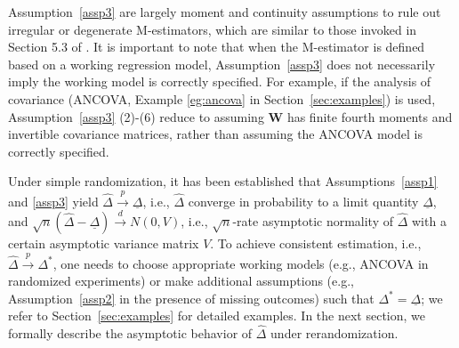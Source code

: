 \documentclass[12pt]{article}
\newcommand{\bW}{\boldsymbol{W}}
\begin{document}
Assumption~\ref{assp3} are largely moment and continuity assumptions to rule out irregular or degenerate M-estimators, which are similar to those invoked in Section 5.3 of \cite{vaart_1998}. It is important to note that when the M-estimator is defined based on a working regression model, Assumption~\ref{assp3} does not necessarily imply the working model is correctly specified. For example, if the analysis of covariance (ANCOVA, Example \ref{eg:ancova} in Section~\ref{sec:examples}) is used, Assumption~\ref{assp3} (2)-(6) reduce to assuming $\bW$ has finite fourth moments and invertible covariance matrices, rather than assuming the ANCOVA model is correctly specified.%

Under simple randomization, it has been established that Assumptions~\ref{assp1} and \ref{assp3} yield $\widehat{\Delta} \xrightarrow{p} \underline{\Delta}$, i.e., $\widehat{\Delta}$ converge  in probability to a limit quantity $\underline{\Delta}$, and $\sqrt{n}(\widehat{\Delta} - \underline{\Delta}) \xrightarrow{d} N(0,V)$, i.e., $\sqrt{n}$-rate asymptotic normality of $\widehat{\Delta}$ \citep{vaart_1998} with a certain asymptotic variance matrix $V$. To achieve consistent estimation, i.e., $\widehat{\Delta} \xrightarrow{p} \Delta^*$, one needs to choose appropriate working models (e.g., ANCOVA in randomized experiments) or make additional assumptions (e.g., Assumption~\ref{assp2} in the presence of missing outcomes) such that $\Delta^* = \underline{\Delta}$; we refer to Section~\ref{sec:examples} for detailed examples. In the next section, we formally describe the asymptotic behavior of $\widehat{\Delta}$ under rerandomization.
\end{document}
